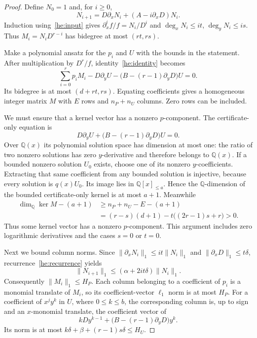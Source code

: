 \documentclass[11pt,a4paper]{article}
\theoremstyle{remark}\newtheorem{remark}[theorem]{Remark}
\begin{document}
\begin{proof}
Define $N_0=1$ and, for $i\ge0$,
\begin{equation}\label{he:recurrence}
 N_{i+1}=D\partial_xN_i+(A-i\partial_xD)N_i.
\end{equation}
Induction using~\eqref{he:input} gives
$\partial_x^if/f=N_i/D^i$ and
$\deg_xN_i\le it$, $\deg_yN_i\le is$. Thus
$M_i=N_iD^{r-i}$ has bidegree at most $(rt,rs)$.

Make a polynomial ansatz for the $p_i$ and $U$ with the bounds in the
statement. After multiplication by $D^r/f$, identity~\eqref{he:identity}
becomes
\begin{equation}\label{he:polysystem}
 \sum_{i=0}^r p_iM_i
 -D\partial_yU-\bigl(B-(r-1)\partial_yD\bigr)U=0.
\end{equation}
Its bidegree is at most $(d+rt,rs)$. Equating coefficients gives a
homogeneous integer matrix $M$ with $E$ rows and $n_P+n_U$ columns.
Zero rows can be included.

We must ensure that a kernel vector has a nonzero $p$-component.
The certificate-only equation is
\begin{equation}\label{he:purecert}
 D\partial_yU+\bigl(B-(r-1)\partial_yD\bigr)U=0.
\end{equation}
Over $\mathbb Q(x)$ its polynomial solution space has dimension at most
one: the ratio of two nonzero solutions has zero $y$-derivative and
therefore belongs to $\mathbb Q(x)$. If a bounded nonzero solution $U_0$
exists, choose one of its nonzero $y$-coefficients. Extracting that same
coefficient from any bounded solution is injective, because every solution
is $q(x)U_0$. Its image lies in $\mathbb Q[x]_{\le a}$. Hence the
$\mathbb Q$-dimension of the bounded certificate-only kernel is at most
$a+1$. Meanwhile
\begin{align*}
 \dim_{\mathbb Q}\ker M-(a+1)
 &\ge n_P+n_U-E-(a+1)\\
 &=(r-s)(d+1)-t\bigl((2r-1)s+r\bigr)>0.
\end{align*}
Thus some kernel vector has a nonzero $p$-component. This argument includes
zero logarithmic derivatives and the cases $s=0$ or $t=0$.

Next we bound column norms. Since
$\|\partial_xN_i\|_1\le it\|N_i\|_1$ and
$\|\partial_xD\|_1\le t\delta$, recurrence~\eqref{he:recurrence} yields
\[
 \|N_{i+1}\|_1\le(\alpha+2it\delta)\|N_i\|_1.
\]
Consequently $\|M_i\|_1\le H_P$. Each column belonging to a coefficient
of $p_i$ is a monomial translate of $M_i$, so its coefficient-vector
$\ell_1$ norm is at most $H_P$. For a coefficient of $x^jy^k$ in $U$,
where $0\le k\le b$, the corresponding column is, up to sign and an
$x$-monomial translate, the coefficient vector of
\[
 kDy^{k-1}+\bigl(B-(r-1)\partial_yD\bigr)y^k.
\]
Its norm is at most
$k\delta+\beta+(r-1)s\delta\le H_U$.


\end{proof}
\end{document}
